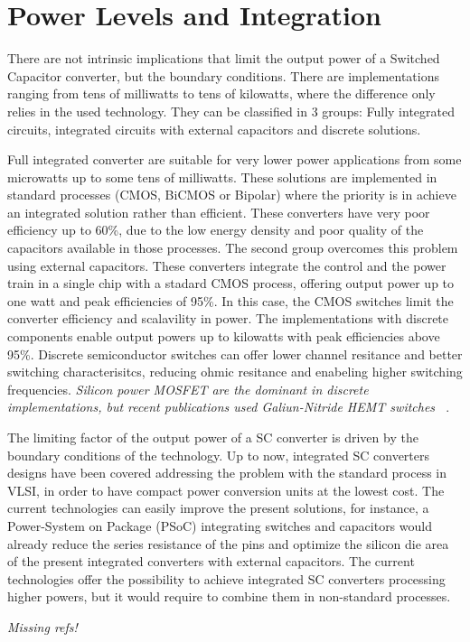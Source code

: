 \section*{Power Levels and Integration}

There are not intrinsic implications that limit the output power of a Switched Capacitor converter, but the boundary conditions. There are implementations ranging from tens of milliwatts to tens of kilowatts, where the difference only relies in the used technology. They can be classified in 3 groups: Fully integrated circuits, integrated circuits with external capacitors and discrete solutions.

Full integrated converter are suitable for very lower power applications from some microwatts up to some tens of milliwatts. These solutions are implemented in standard processes (CMOS, BiCMOS or Bipolar) where the priority is in achieve an integrated solution rather than efficient. These converters have very poor efficiency up to 60\%, due to the low energy density and poor quality of the capacitors available in those processes. The second group overcomes this problem using external capacitors. These converters integrate the control and the power train in a single chip with a stadard CMOS process, offering  output power up to one watt and peak efficiencies of 95\%. In this case, the CMOS switches limit the converter efficiency and scalavility in power.
The implementations with discrete components enable output powers up to kilowatts with peak efficiencies above 95\%. Discrete semiconductor switches can offer lower channel resitance and better switching characterisitcs, reducing ohmic resitance and enabeling higher switching frequencies.  \emph{ \color{red} Silicon power MOSFET are the dominant in discrete implementations, but recent publications used Galiun-Nitride HEMT switches ~\cite{11Scott,12Scott}}.

The limiting factor of the output power of a SC converter is driven by the boundary conditions of the technology. Up to now, integrated SC converters designs have been covered addressing the problem with the standard process in VLSI, in order to have compact power conversion units at the lowest cost. The current technologies can easily improve the present solutions, for instance, a Power-System on Package (PSoC) integrating switches and capacitors would already reduce the series resistance of the pins and optimize the silicon die area of the present integrated converters with external capacitors. The current technologies offer the possibility to achieve integrated SC converters processing higher powers, but it would require to combine them in non-standard processes.

\emph{\color{red} Missing refs!}


%
%


 